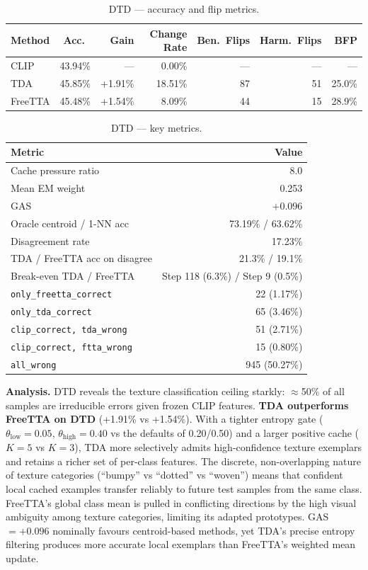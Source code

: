 \documentclass[12pt,a4paper]{article}
\newcommand{\1}{\mathbf{1}}
\begin{document}
\begin{table}[H]
\centering
\caption{DTD --- accuracy and flip metrics.}
\label{tab:dtd_flip}
\begin{tabular}{@{}lrrrrrr@{}}
\toprule
Method & Acc.\ & Gain & Change Rate & Ben.\ Flips & Harm.\ Flips & BFP \\
\midrule
CLIP    & 43.94\% & ---    & 0.00\%  & ---  & ---  & --- \\
TDA     & 45.85\% & +1.91\% & 18.51\% & 87  & 51   & 25.0\% \\
FreeTTA & 45.48\% & +1.54\% & 8.09\%  & 44  & 15   & 28.9\% \\
\bottomrule
\end{tabular}
\end{table}

\begin{table}[H]
\centering
\caption{DTD --- key metrics.}
\label{tab:dtd_internal}
\begin{tabular}{@{}lr@{}}
\toprule
Metric & Value \\
\midrule
Cache pressure ratio         & 8.0 \\
Mean EM weight               & 0.253 \\
GAS                          & $+0.096$ \\
Oracle centroid / 1-NN acc   & 73.19\% / 63.62\% \\
Disagreement rate            & 17.23\% \\
TDA / FreeTTA acc on disagree & 21.3\% / 19.1\% \\
Break-even TDA / FreeTTA     & Step 118 (6.3\%) / Step 9 (0.5\%) \\
\texttt{only\_freetta\_correct} & 22 (1.17\%) \\
\texttt{only\_tda\_correct}     & 65 (3.46\%) \\
\texttt{clip\_correct, tda\_wrong}  & 51 (2.71\%) \\
\texttt{clip\_correct, ftta\_wrong} & 15 (0.80\%) \\
\texttt{all\_wrong}             & 945 (50.27\%) \\
\bottomrule
\end{tabular}
\end{table}

\textbf{Analysis.} DTD reveals the texture classification ceiling starkly: $\approx$50\% of all samples are irreducible errors given frozen CLIP features.
\textbf{TDA outperforms FreeTTA on DTD} (+1.91\% vs +1.54\%).
With a tighter entropy gate ($\theta_{\text{low}}=0.05$, $\theta_{\text{high}}=0.40$ vs the defaults of 0.20/0.50) and a larger positive cache ($K=5$ vs $K=3$), TDA more selectively admits high-confidence texture exemplars and retains a richer set of per-class features.
The discrete, non-overlapping nature of texture categories (``bumpy'' vs ``dotted'' vs ``woven'') means that confident local cached examples transfer reliably to future test samples from the same class.
FreeTTA's global class mean is pulled in conflicting directions by the high visual ambiguity among texture categories, limiting its adapted prototypes.
GAS $= +0.096$ nominally favours centroid-based methods, yet TDA's precise entropy filtering produces more accurate local exemplars than FreeTTA's weighted mean update.
\end{document}
